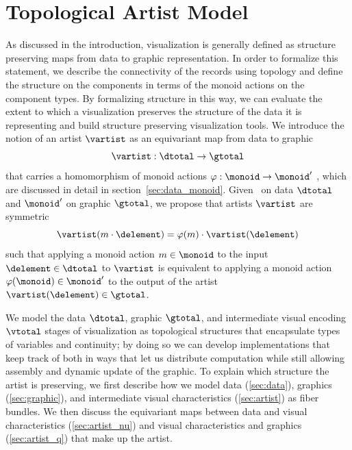 \documentclass[../main.tex]{subfiles}
\begin{document}
\section{Topological Artist Model}
\label{sec:tam}

As discussed in the introduction, visualization is generally defined as structure preserving maps from data to graphic representation. In order to formalize this statement, we describe the connectivity of the records using topology and define the structure on the components in terms of the monoid actions on the component types. By formalizing structure in this way, we can evaluate the extent to which a visualization preserves the structure of the data it is representing and build structure preserving visualization tools. 
We introduce the notion of an artist $\mathscr{\vartist}$ as an equivariant map from data to graphic
\begin{equation}
    \label{eq:artist}
    \mathscr{\vartist}: \mathscr{\dtotal} \rightarrow \mathscr{\gtotal}
\end{equation}
that carries a homomorphism of monoid actions $\varphi: \monoid \rightarrow \monoid^{\prime}$ \cite{cegarraCohomologyMonoidsOperators2019}, which are discussed in detail in section~\ref{sec:data_monoid}. Given \monoid\ on data $\mathscr{\dtotal}$ and $\monoid^{\prime}$ on graphic $\mathscr{\gtotal}$, we propose that artists $\mathscr{\vartist}$ are symmetric 
\begin{equation}
\mathscr{\vartist}(m\cdot \delement) = \varphi(m)\cdot\mathscr{\vartist}(\delement) 
\end{equation}
such that applying a monoid action $m \in \monoid$ to the input $\delement \in \mathscr{\dtotal}$ to $\mathscr{\vartist}$ is equivalent to applying a monoid action $\varphi(\monoid) \in \monoid^{\prime}$ to the output of the artist $\vartist(\delement) \in \mathscr{\gtotal}$.

We model the data $\mathscr{\dtotal}$, graphic $\mathscr{\gtotal}$, and intermediate visual encoding $\mathscr{\vtotal}$ stages of visualization as topological structures that encapsulate types of variables and continuity; by doing so we can develop implementations that keep track of both in ways that let us distribute computation while still allowing assembly and dynamic update of the graphic. To explain which structure the artist is preserving, we first describe how we model data (\ref{sec:data}), graphics (\ref{sec:graphic}), and intermediate visual characteristics (\ref{sec:artist}) as fiber bundles. We then discuss the equivariant maps between data and visual characteristics (\ref{sec:artist_nu}) and visual characteristics and graphics (\ref{sec:artist_q}) that make up the artist.
\end{document}
